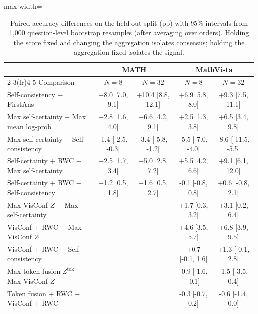 \begin{table}[htbp]
\centering
\footnotesize
\caption{Paired accuracy differences on the held-out split (pp) with 95\% intervals from 1{,}000 question-level bootstrap resamples (after averaging over orders). Holding the score fixed and changing the aggregation isolates consensus; holding the aggregation fixed isolates the signal.}
\label{tab:t3-boot}
\begin{adjustbox}{max width=\linewidth}
\begin{tabular}{lcccc}
\toprule
 & \multicolumn{2}{c}{MATH} & \multicolumn{2}{c}{MathVista} \\
\cmidrule(lr){2-3}\cmidrule(lr){4-5}
Comparison & $N{=}8$ & $N{=}32$ & $N{=}8$ & $N{=}32$ \\
\midrule
Self-consistency $-$ FirstAns & +8.0 [7.0, 9.1] & +10.4 [8.8, 12.1] & +6.9 [5.8, 8.0] & +9.3 [7.5, 11.1] \\
Max self-certainty $-$ Max mean log-prob & +2.8 [1.6, 4.0] & +6.6 [4.2, 9.1] & +2.5 [1.3, 3.8] & +6.5 [3.4, 9.8] \\
Max self-certainty $-$ Self-consistency & -1.4 [-2.5, -0.3] & -3.4 [-5.8, -1.2] & -5.5 [-7.0, -4.0] & -8.6 [-11.5, -5.5] \\
Self-certainty + RWC $-$ Max self-certainty & +2.5 [1.7, 3.4] & +5.0 [2.8, 7.2] & +5.5 [4.2, 6.6] & +9.1 [6.1, 12.0] \\
Self-certainty + RWC $-$ Self-consistency & +1.2 [0.5, 1.8] & +1.6 [0.5, 2.7] & -0.1 [-0.8, 0.8] & +0.6 [-0.8, 2.1] \\
\midrule
Max VisConf $Z$ $-$ Max self-certainty & -- & -- & +1.7 [0.3, 3.2] & +3.1 [0.2, 6.4] \\
VisConf + RWC $-$ Max VisConf $Z$ & -- & -- & +4.6 [3.5, 5.7] & +6.8 [3.9, 9.5] \\
VisConf + RWC $-$ Self-consistency & -- & -- & +0.7 [-0.1, 1.6] & +1.3 [-0.1, 2.8] \\
Max token fusion $Z^\text{tok}$ $-$ Max VisConf $Z$ & -- & -- & -0.9 [-1.6, -0.1] & -1.5 [-3.5, 0.4] \\
Token fusion + RWC $-$ VisConf + RWC & -- & -- & -0.3 [-0.7, 0.2] & -0.6 [-1.4, 0.0] \\
\bottomrule
\end{tabular}
\end{adjustbox}
\end{table}
